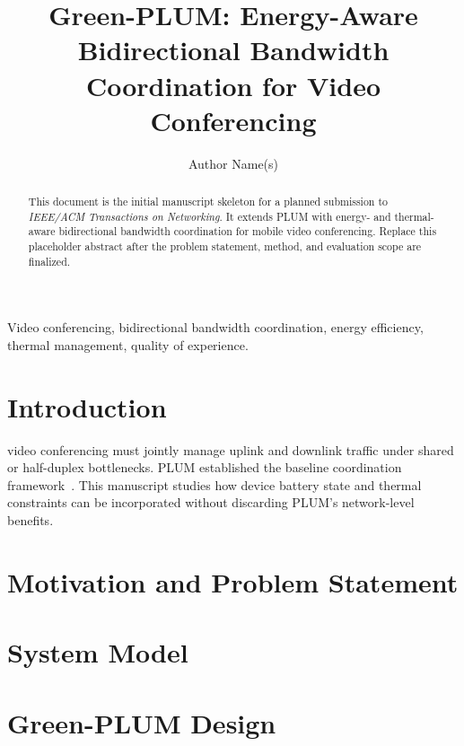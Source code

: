 \documentclass[journal]{IEEEtran}
\title{Green-PLUM: Energy-Aware Bidirectional Bandwidth Coordination for Video Conferencing}
\author{Author Name(s)}
\begin{document}
\maketitle

\begin{abstract}
This document is the initial manuscript skeleton for a planned submission to
\emph{IEEE/ACM Transactions on Networking}. It extends PLUM with energy- and
thermal-aware bidirectional bandwidth coordination for mobile video
conferencing. Replace this placeholder abstract after the problem statement,
method, and evaluation scope are finalized.
\end{abstract}

\begin{IEEEkeywords}
Video conferencing, bidirectional bandwidth coordination, energy efficiency,
thermal management, quality of experience.
\end{IEEEkeywords}

\section{Introduction}
 video conferencing must jointly manage uplink and
downlink traffic under shared or half-duplex bottlenecks. PLUM established the
baseline coordination framework~\cite{plum2024}. This manuscript studies how
device battery state and thermal constraints can be incorporated without
discarding PLUM's network-level benefits.

\section{Motivation and Problem Statement}

\section{System Model}

\section{Green-PLUM Design}
\end{document}
